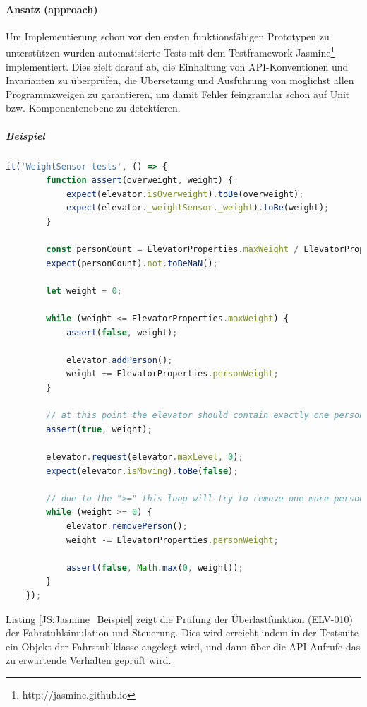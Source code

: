 \paragraph{Ansatz (approach)}
Um Implementierung schon vor den ersten funktionsfähigen Prototypen zu unterstützen wurden automatisierte Tests mit dem Testframework Jasmine\footnote{http://jasmine.github.io} implementiert. Dies zielt darauf ab, die Einhaltung von API-Konventionen und Invarianten zu überprüfen, die Übersetzung und Ausführung von möglichst allen Programmzweigen zu garantieren, um damit Fehler feingranular schon auf Unit bzw. Komponentenebene zu detektieren.
\subparagraph{Beispiel} \begin{lstlisting}[language=JavaScript,label=JS:Jasmine_Beispiel,caption=Jasmine Test Beispiel]
	it('WeightSensor tests', () => {
		function assert(overweight, weight) {
			expect(elevator.isOverweight).toBe(overweight);
			expect(elevator._weightSensor._weight).toBe(weight);
		}

		const personCount = ElevatorProperties.maxWeight / ElevatorProperties.personWeight;
		expect(personCount).not.toBeNaN();

		let weight = 0;

		while (weight <= ElevatorProperties.maxWeight) {
			assert(false, weight);

			elevator.addPerson();
			weight += ElevatorProperties.personWeight;
		}

		// at this point the elevator should contain exactly one person more than maximally allowed
		assert(true, weight);

		elevator.request(elevator.maxLevel, 0);
		expect(elevator.isMoving).toBe(false);

		// due to the ">=" this loop will try to remove one more person after the elevator is already empty
		while (weight >= 0) {
			elevator.removePerson();
			weight -= ElevatorProperties.personWeight;

			assert(false, Math.max(0, weight));
		}
	});
\end{lstlisting}
Listing \ref{JS:Jasmine_Beispiel} zeigt die Prüfung der Überlastfunktion (ELV-010) der Fahrstuhlsimulation und Steuerung. Dies wird erreicht indem in der Testsuite ein Objekt der Fahrstuhlklasse angelegt wird, und dann über die API-Aufrufe das zu erwartende Verhalten geprüft wird.

